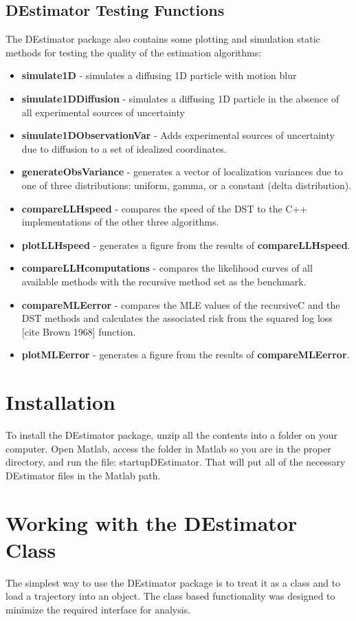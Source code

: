 \documentclass{article}
\begin{document}
\subsection{DEstimator Testing Functions}
The DEstimator package also contains some plotting and simulation static methods for testing the quality of the estimation algorithms:
\begin{itemize}
    \item \textbf{simulate1D} - simulates a diffusing 1D particle with motion blur
    \item \textbf{simulate1DDiffusion} - simulates a diffusing 1D particle in the absence of all experimental sources of uncertainty
    \item \textbf{simulate1DObservationVar} - Adds experimental sources of uncertainty due to diffusion to a set of idealized coordinates.
    \item \textbf{generateObsVariance} - generates a vector of localization variances due to one of three distributions: uniform, gamma, or a constant (delta distribution).
    \item \textbf{compareLLHspeed} - compares the speed of the DST to the C++ implementations of the other three algorithms.
    \item \textbf{plotLLHspeed} - generates a figure from the results of \textbf{compareLLHspeed}.
    \item \textbf{compareLLHcomputations} - compares the likelihood curves of all available methods with the recursive method set as the benchmark.
    \item \textbf{compareMLEerror} - compares the MLE values of the recursiveC and the DST methods and calculates the associated risk from the squared log loss [cite Brown 1968] function.
    \item \textbf{plotMLEerror} - generates a figure from the results of \textbf{compareMLEerror}.
\end{itemize}

\section{Installation}
To install the DEstimator package, unzip all the contents into a folder on your computer.  Open Matlab, access the folder in Matlab so you are in the proper directory, and run the file: startupDEstimator.  That will put all of the necessary DEstimator files in the Matlab path.

\section{Working with the DEstimator Class}
\label{sec:DEstClass}
The simplest way to use the DEstimator package is to treat it as a class and to load a trajectory into an object.  The class based functionality was designed to minimize the required interface for analysis.
\end{document}
